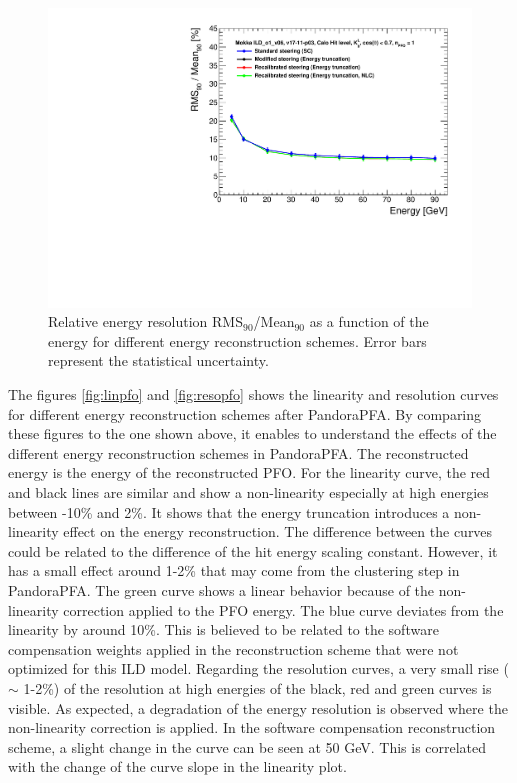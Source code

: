 \begin{figure}[htbp!]
  \centering
  \includegraphics[width=0.6\linewidth]{../Thesis_Plots/ILD/CheckCalib/Comparison_resolution_Curves_Hits}
  \caption{Relative energy resolution RMS$_{90}$/Mean$_{90}$ as a function of the energy for different energy reconstruction schemes. Error bars represent the statistical uncertainty.} \label{fig:resohits}
\end{figure}

The figures \ref{fig:linpfo} and \ref{fig:resopfo} shows the linearity and resolution curves for different energy reconstruction schemes after PandoraPFA. By comparing these figures to the one shown above, it enables to understand the effects of the different energy reconstruction schemes in PandoraPFA. The reconstructed energy is the energy of the reconstructed PFO. For the linearity curve, the red and black lines are similar and show a non-linearity especially at high energies between -10\% and 2\%. It shows that the energy truncation introduces a non-linearity effect on the energy reconstruction. The difference between the curves could be related to the difference of the hit energy scaling constant. However, it has a small effect around 1-2\% that may come from the clustering step in PandoraPFA. The green curve shows a linear behavior because of the non-linearity correction applied to the PFO energy. The blue curve deviates from the linearity by around 10\%. This is believed to be related to the software compensation weights applied in the reconstruction scheme that were not optimized for this ILD model. Regarding the resolution curves, a very small rise ($\sim$ 1-2\%) of the resolution at high energies of the black, red and green curves is visible. As expected, a degradation of the energy resolution is observed where the non-linearity correction is applied. In the software compensation reconstruction scheme, a slight change in the curve can be seen at 50 GeV. This is correlated with the change of the curve slope in the linearity plot.

